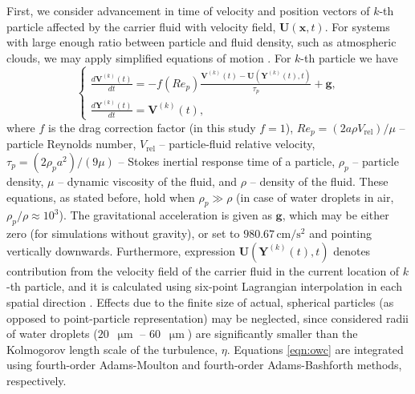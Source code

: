 \documentclass{pracamgren}
\begin{document}
First, we consider advancement in time of velocity and position vectors of $k$-th particle affected by the carrier fluid with velocity field, $\mathbf{U}(\mathbf{x}, t)$.
For systems with large enough ratio between particle and fluid density, such as atmospheric clouds, we may apply simplified equations of motion \parencite{Maxey1983}.
For $k$-th particle we have
\begin{equation}
  \left\{
  \begin{array}{ll}
  \frac{d \mathbf{V}^{(k)}(t)}{d t} = - f (Re_p) \frac{ \mathbf{V}^{(k)}(t) - \mathbf{U}(\mathbf{Y}^{(k)}(t), t) }{\tau_{p}} + \mathbf{g} ,\\
  \frac{d \mathbf{Y}^{(k)}(t)}{d t} = \mathbf{V}^{(k)}(t) ,
  \end{array}
  \right.
  \label{eqn:owc}
\end{equation}
where $f$ is the drag correction factor (in this study $f = 1$), $Re_p = (2 a \rho V_{\text{rel}}) / \mu $ -- particle Reynolds number, $V_{\text{rel}}$ -- particle-fluid relative velocity, $\tau_{p} = (2 \rho_{p} a^{2}) / (9 \mu)$ -- Stokes inertial response time of a particle, $\rho_{p}$ -- particle density, $\mu$ -- dynamic viscosity of the fluid, and $\rho$ -- density of the fluid.
These equations, as stated before, hold when $\rho_p \gg \rho$ (in case of water droplets in air, $\rho_p / \rho \approx 10^3$). 
The gravitational acceleration is given as $\mathbf{g}$, which may be either zero (for simulations without gravity), or set to $980.67 \, \text{cm} / \text{s}^{2}$ and pointing vertically downwards. 
Furthermore, expression $\mathbf{U}(\mathbf{Y}^{(k)}(t), t)$ denotes contribution from the velocity field of the carrier fluid in the current location of $k$-th particle, and it is calculated using six-point Lagrangian interpolation in each spatial direction \parencite{Ayala2014}.
Effects due to the finite size of actual, spherical particles (as opposed to point-particle representation) may be neglected, since considered radii of water droplets ($20$~$\upmu\text{m}$ -- $60$~$\upmu\text{m}$) are significantly smaller than the Kolmogorov length scale of the turbulence, $\eta$. 
Equations \ref{eqn:owc} are integrated using fourth-order Adams-Moulton and fourth-order Adams-Bashforth methods, respectively.
\end{document}
